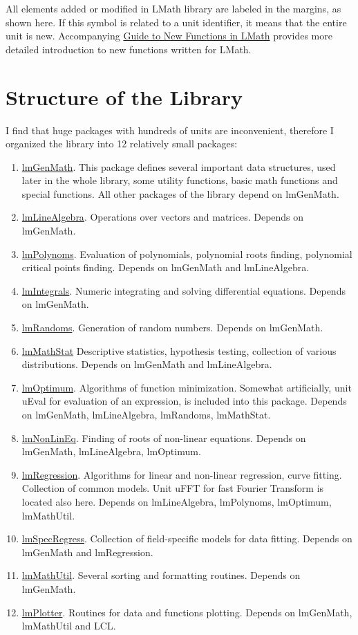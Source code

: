 \documentclass[12pt,a4paper,oneside]{report}
\newcommand{\lmath}[1]{   %
	\marginpar{\vspace{#1} 
		\begin{flushright}
			LMath
	\end{flushright} }
}
\begin{document}
All elements added or modified in LMath library are labeled in the margins, as shown here.\lmath{-28pt} If this symbol is related to a unit identifier, it means that the entire unit is new. Accompanying \href{LMath_NewFunc_guide}{Guide to New Functions in LMath} provides more detailed introduction to new functions written for LMath. 
\chapter{Structure of the Library}
I find that huge packages with hundreds of units are inconvenient, therefore I organized the library into 12 relatively small packages:
\begin{enumerate}
	\item{\hyperref[package-lmGenMath]{lmGenMath}.} This package defines several important data structures, used later in the whole library, some utility functions, basic math functions and special functions. All other packages of the library depend on lmGenMath.
	\item{\hyperref[package-lmLineAlgebra]{lmLineAlgebra}.} Operations over vectors and matrices. Depends on lmGenMath.
	\item{\hyperref[package-lmPolynoms]{lmPolynoms}.} Evaluation of polynomials, polynomial roots finding, polynomial critical points finding. Depends on lmGenMath and lmLineAlgebra.
	\item{\hyperref[package-lmIntegrals]{lmIntegrals}.} Numeric integrating and solving differential equations. Depends on lmGenMath.
	\item{\hyperref[package-lmRandoms]{lmRandoms}.} Generation of random numbers. Depends on lmGenMath.
	\item{\hyperref[package-lmMathStat]{lmMathStat}} Descriptive statistics, hypothesis testing, collection of various distributions. Depends on lmGenMath and lmLineAlgebra.
	\item{\hyperref[package-lmOptimum]{lmOptimum}.} Algorithms of function minimization. Somewhat artificially, unit uEval for evaluation of an expression, is included into this package. Depends on lmGenMath, lmLineAlgebra, lmRandoms, lmMathStat.
	\item{\hyperref[package-lmNonLinEq]{lmNonLinEq}.} Finding of roots of non-linear equations. Depends on lmGenMath, lmLineAlgebra, lmOptimum.
	\item{\hyperref[package-lmRegression]{lmRegression}.} Algorithms for linear and non-linear regression, curve fitting. Collection of common models. Unit uFFT for fast Fourier Transform is located also here.  Depends on lmLineAlgebra, lmPolynoms, lmOptimum, lmMathUtil.
	\item{\hyperref[package-lmSpecRegress]{lmSpecRegress}.} Collection of field-specific models for data fitting. Depends on lmGenMath and lmRegression.
	\item{\hyperref[package-lmMathUtil]{lmMathUtil}.} Several sorting and formatting routines. Depends on lmGenMath.
	\item{\hyperref[package-lmPlotter]{lmPlotter}.} Routines for data and functions plotting. Depends on lmGenMath, lmMathUtil and LCL.
\end{enumerate}	
\end{document}
